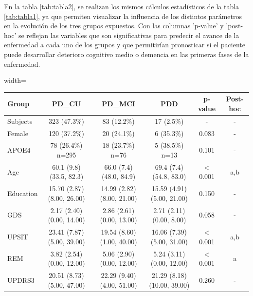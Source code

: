 \documentclass[12pt]{article}
\begin{document}
\begin{description}
	 En la tabla \ref{tab:tabla2}, se realizan los mismos cálculos estadísticos de la tabla \ref{tab:tabla1}, ya que permiten visualizar la influencia de los distintos parámetros en la evolución de los tres grupos expuestos. Con las columnas 'p-value' y 'post-hoc' se reflejan las variables que son significativas para predecir el avance de la enfermedad a cada uno de los grupos y que permitirían pronosticar si el paciente puede desarrollar deterioro cognitivo medio o demencia en las primeras fases de la enfermedad.
	 
	\begin{table}[t]
		\begin{adjustbox}{width=\textwidth}
			\begin{tabular}{|l||c|c|c|c|c|}
				\toprule
				Group &                              PD\_CU &                             PD\_MCI &                        PDD &   p-value & Post-hoc \\ 
				\midrule
				Subjects &                        323 (47.3\%) &                         83 (12.2\%) &                          17 (2.5\%) &     -      &    -      \\
				Female &                        120 (37.2\%) &                         20 (24.1\%) &                          6 (35.3\%) &     0.083 &  -    \\
				APOE4 &                   78 (26.4\%) n=295 &                    18 (23.7\%) n=76 &                     5 (38.5\%) n=13 &     0.101 &  -    \\
				Age &            60.1 (9.8) (33.5, 82.3) &            66.0 (7.4) (48.0, 84.9) &            69.4 (7.4) (54.8, 83.0) & $<$ 0.001 &      a,b \\
				Education &         15.70 (2.87) (8.00, 26.00) &         14.99 (2.82) (8.00, 21.00) &         15.59 (4.91) (5.00, 21.00) &     0.150 &  -    \\
				\hline
				GDS &          2.17 (2.40) (0.00, 14.00) &          2.86 (2.61) (0.00, 13.00) &           2.71 (2.11) (0.00, 8.00) &     0.058 &   -   \\
				UPSIT &         23.41 (7.87) (5.00, 39.00) &         19.54 (8.60) (1.00, 40.00) &         16.06 (7.39) (5.00, 31.00) & $<$ 0.001 &      a,b \\
				REM &          3.82 (2.54) (0.00, 12.00) &          5.06 (2.90) (0.00, 12.00) &          5.24 (3.11) (0.00, 12.00) & $<$ 0.001 &        a \\
				UPDRS3 &         20.51 (8.73) (5.00, 47.00) &         22.29 (9.40) (4.00, 51.00) &        21.29 (8.18) (10.00, 39.00) &     0.260 &  -    \\

\end{tabular}
\end{adjustbox}
\end{table}
\end{description}
\end{document}
